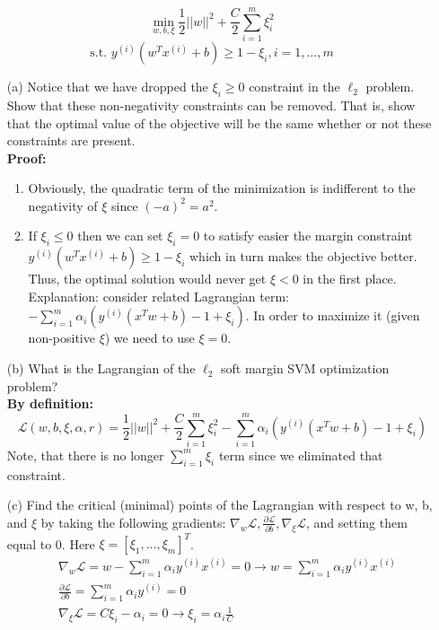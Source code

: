 \documentclass{article}
\newcommand{\ith}{^{(i)}}
\begin{document}
$$ \min_{w, b, \xi} \frac{1}{2} ||w||^2 + \frac{C}{2} \sum_{i=1}^{m}\xi_i^2 $$
$$ \text{s.t. } y\ith (w^Tx\ith +b) \ge 1 - \xi_i, i = 1,...,m $$

\begin{itemize}
	\item[(a)] Notice that we have dropped the $\xi_i \ge 0$ constraint in the $\ell_2$ problem. Show that these non-negativity constraints can be removed. That is, show that the optimal value of the objective will be the same whether or not these constraints are present.\\
	\textbf{Proof:}
	\begin{enumerate}
		\item Obviously, the quadratic term of the minimization is indifferent to the negativity of $\xi$ since  $(-a)^2=a^2$.
		\item If $\xi_i \le 0$ then we can set $\xi_i=0$ to satisfy easier the margin constraint $y\ith (w^Tx\ith +b) \ge 1 - \xi_i$  which in turn makes the objective better. Thus, the optimal solution would never get $\xi < 0$ in the first place.  \\
		Explanation: consider related Lagrangian term: 	$-\sum_{i=1}^{m} \alpha_i (y\ith(x^Tw+b)-1 + \xi_i) $. In order to maximize it (given non-positive  $\xi$) we need to use $\xi = 0$.
	\end{enumerate}
	
	
	\item[(b)] What is the Lagrangian of the $\ell_2$ soft margin SVM optimization problem?\\
	\textbf{By definition:}
	$$\mathcal{L}(w,b,\xi,\alpha,r) = \frac{1}{2} ||w||^2 
	+ \frac{C}{2}\sum_{i=1}^{m}\xi_i^2 
	-\sum_{i=1}^{m} \alpha_i (y\ith(x^Tw+b)-1 + \xi_i) $$
	Note, that there is no longer $\sum_{i=1}^{m} \xi_i$ term since we eliminated that constraint.
	
	\item[(c)] Find the critical (minimal) points of the Lagrangian with respect to w, b, and $\xi$ by taking the following gradients: $\nabla_w \mathcal{L}, \frac{\partial \mathcal{L}}{\partial b}, \nabla_\xi \mathcal{L}$,  and setting them equal to 0. Here $\xi = [\xi_1, ..., \xi_m]^T$.
	\begin{align*}
	& \nabla_w \mathcal{L} = w - \sum_{i=1}^{m} \alpha_i y\ith x\ith = 0 
		\rightarrow w = \sum_{i=1}^{m} \alpha_i y\ith x\ith\\
	& \frac{\partial \mathcal{L}}{\partial b} = \sum_{i=1}^{m} \alpha_i y\ith = 0 \\
	& \nabla_\xi \mathcal{L} = C\xi_i - \alpha_i = 0 \rightarrow \xi_i = \alpha_i \frac{1}{C} 
	\end{align*}
	

\end{itemize}
\end{document}
